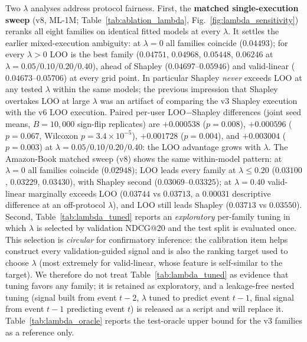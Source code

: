 \documentclass[pdflatex,sn-mathphys-num]{sn-jnl}
\begin{document}
Two $\lambda$ analyses address protocol fairness. First, the \textbf{matched single-execution sweep} (v8, ML-1M; Table~\ref{tab:ablation_lambda}, Fig.~\ref{fig:lambda_sensitivity}) reranks all eight families on identical fitted models at every $\lambda$. It settles the earlier mixed-execution ambiguity: at $\lambda=0$ all families coincide ($0.04493$); for every $\lambda>0$ LOO is the best family ($0.04751$, $0.04968$, $0.05448$, $0.06246$ at $\lambda=0.05/0.10/0.20/0.40$), ahead of Shapley ($0.04697$--$0.05946$) and valid-linear ($0.04673$--$0.05706$) at every grid point. In particular Shapley \emph{never} exceeds LOO at any tested $\lambda$ within the same models; the previous impression that Shapley overtakes LOO at large $\lambda$ was an artifact of comparing the v3 Shapley execution with the v6 LOO execution. Paired per-user LOO$-$Shapley differences (joint seed means, $B=10{,}000$ sign-flip replicates) are $+0.000538$ ($p=0.008$), $+0.000596$ ($p=0.067$, Wilcoxon $p=3.4\times10^{-5}$), $+0.001728$ ($p=0.004$), and $+0.003004$ ($p=0.003$) at $\lambda=0.05/0.10/0.20/0.40$: the LOO advantage grows with $\lambda$. The Amazon-Book matched sweep (v8) shows the same within-model pattern: at $\lambda=0$ all families coincide ($0.02948$); LOO leads every family at $\lambda\le0.20$ ($0.03100$, $0.03229$, $0.03430$), with Shapley second ($0.03069$--$0.03325$); at $\lambda=0.40$ valid-linear marginally exceeds LOO ($0.03744$ vs $0.03713$, a $0.00031$ descriptive difference at an off-protocol $\lambda$), and LOO still leads Shapley ($0.03713$ vs $0.03550$). Second, Table~\ref{tab:lambda_tuned} reports an \emph{exploratory} per-family tuning in which $\lambda$ is selected by validation NDCG@20 and the test split is evaluated once. This selection is \emph{circular} for confirmatory inference: the calibration item helps construct every validation-guided signal and is also the ranking target used to choose $\lambda$ (most extremely for valid-linear, whose feature is self-similar to the target). We therefore do not treat Table~\ref{tab:lambda_tuned} as evidence that tuning favors any family; it is retained as exploratory, and a leakage-free nested tuning (signal built from event $t-2$, $\lambda$ tuned to predict event $t-1$, final signal from event $t-1$ predicting event $t$) is released as a script and will replace it. Table~\ref{tab:lambda_oracle} reports the test-oracle upper bound for the v3 families as a reference only.
\end{document}
